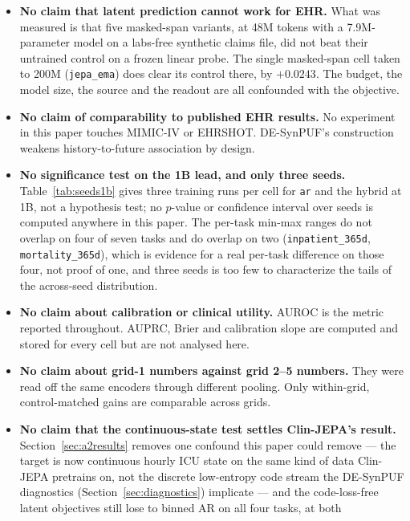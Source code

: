 \documentclass[11pt,a4paper]{article}
\newcommand{\code}[1]{\texttt{\small #1}}
\begin{document}
\begin{itemize}[leftmargin=*,itemsep=3pt,topsep=3pt]
\item \textbf{No claim that latent prediction cannot work for EHR.} What was
      measured is that five masked-span variants, at 48M tokens with a 7.9M-parameter
      model on a labs-free synthetic claims file, did not beat their untrained
      control on a frozen linear probe. The single masked-span cell taken to
      200M (\code{jepa\_ema}) does clear its control there, by $+0.0243$. The
      budget, the model size, the source and the readout are all confounded with
      the objective.
\item \textbf{No claim of comparability to published EHR results.} No
      experiment in this paper touches MIMIC-IV or EHRSHOT. DE-SynPUF's
      construction weakens history-to-future association by design.
\item \textbf{No significance test on the 1B lead, and only three seeds.}
      Table~\ref{tab:seeds1b} gives three training runs per cell for
      \code{ar} and the hybrid at 1B, not a hypothesis test; no $p$-value or
      confidence interval over seeds is computed anywhere in this paper. The
      per-task min-max ranges do not overlap on four of seven tasks and do
      overlap on two (\code{inpatient\_365d}, \code{mortality\_365d}), which
      is evidence for a real per-task difference on those four, not proof of
      one, and three seeds is too few to characterize the tails of the
      across-seed distribution.
\item \textbf{No claim about calibration or clinical utility.} AUROC is the
      metric reported throughout. AUPRC, Brier and calibration slope are
      computed and stored for every cell but are not analysed here.
\item \textbf{No claim about grid-1 numbers against grid 2--5 numbers.} They
      were read off the same encoders through different pooling. Only
      within-grid, control-matched gains are comparable across grids.
\item \textbf{No claim that the continuous-state test settles Clin-JEPA's
      result.} Section~\ref{sec:a2results} removes one confound this paper
      could remove --- the target is now continuous hourly ICU state on the
      same kind of data Clin-JEPA \citep{clinjepa} pretrains on, not the
      discrete low-entropy code stream the DE-SynPUF diagnostics
      (Section~\ref{sec:diagnostics}) implicate --- and the code-loss-free
      latent objectives still lose to binned AR on all four tasks, at both

\end{itemize}
\end{document}

